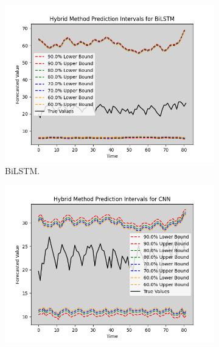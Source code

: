 \begin{figure}[H]
    \centering
        \begin{minipage}{0.4\textwidth}
            \centering
            \begin{subfigure}[b]{\textwidth}
                \centering
                \includegraphics[width=\textwidth]{Chap03/figs/BiLSTM_hybrid_method_plot_Web_Traffic_Dataset_Method2.png}
                \caption{BiLSTM.}
            \end{subfigure}
            \hfill
            \begin{subfigure}[b]{\textwidth}
                \centering
                \includegraphics[width=\textwidth]{Chap03/figs/CNN_hybrid_method_plot_Web_Traffic_Dataset_Method2.png}

\end{subfigure}
\end{minipage}
\end{figure}
